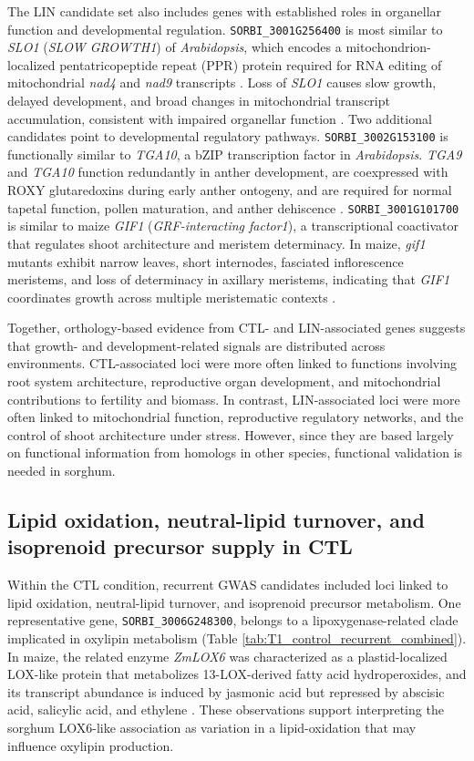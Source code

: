 \documentclass[9pt,twocolumn,twoside]{rilabRxiv}
\begin{document}
The LIN candidate set also includes genes with established roles in organellar function and developmental regulation. \texttt{SORBI\_3001G256400} is most similar to \textit{SLO1} (\textit{SLOW GROWTH1}) of \textit{Arabidopsis}, which encodes a mitochondrion-localized pentatricopeptide repeat (PPR) protein required for RNA editing of mitochondrial \textit{nad4} and \textit{nad9} transcripts \citep{Sung2010}. Loss of \textit{SLO1} causes slow growth, delayed development, and broad changes in mitochondrial transcript accumulation, consistent with impaired organellar function \citep{Sung2010}. Two additional candidates point to developmental regulatory pathways. \texttt{SORBI\_3002G153100} is functionally similar to \textit{TGA10}, a bZIP transcription factor in \textit{Arabidopsis}. \textit{TGA9} and \textit{TGA10} function redundantly in anther development, are coexpressed with ROXY glutaredoxins during early anther ontogeny, and are required for normal tapetal function, pollen maturation, and anther dehiscence \citep{Murmu2010}. \texttt{SORBI\_3001G101700} is similar to maize \textit{GIF1} (\textit{GRF-interacting factor1}), a transcriptional coactivator that regulates shoot architecture and meristem determinacy. In maize, \textit{gif1} mutants exhibit narrow leaves, short internodes, fasciated inflorescence meristems, and loss of determinacy in axillary meristems, indicating that \textit{GIF1} coordinates growth across multiple meristematic contexts \citep{Zhang2018GIF1}.

Together, orthology-based evidence from CTL- and LIN-associated genes suggests that growth- and development-related signals are distributed across environments. CTL-associated loci were more often linked to functions involving root system architecture, reproductive organ development, and mitochondrial contributions to fertility and biomass. In contrast, LIN-associated loci were more often linked to mitochondrial function, reproductive regulatory networks, and the control of shoot architecture under stress. However, since they are based largely on functional information from homologs in other species, functional validation is needed in sorghum.


\subsection{Lipid oxidation, neutral-lipid turnover, and isoprenoid precursor supply in CTL}

Within the CTL condition, recurrent GWAS candidates included loci linked to lipid oxidation, neutral-lipid turnover, and isoprenoid precursor metabolism. One representative gene, \texttt{SORBI\_3006G248300}, belongs to a lipoxygenase-related clade implicated in oxylipin metabolism (Table \ref{tab:T1_control_recurrent_combined}). In maize, the related enzyme \textit{ZmLOX6} was characterized as a plastid-localized LOX-like protein that metabolizes 13-LOX-derived fatty acid hydroperoxides, and its transcript abundance is induced by jasmonic acid but repressed by abscisic acid, salicylic acid, and ethylene \citep{Gao2008ZmLOX6}. These observations support interpreting the sorghum LOX6-like association as variation in a lipid-oxidation that may influence oxylipin production.
\end{document}
